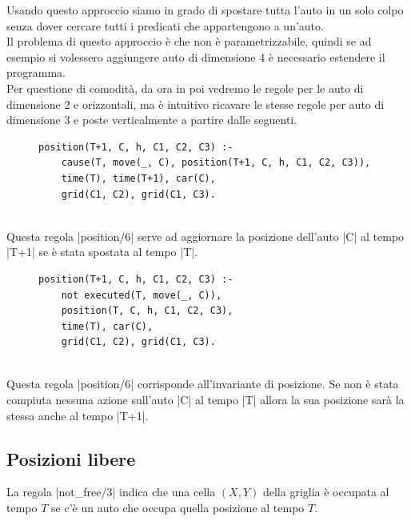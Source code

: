 \documentclass[10pt, a4paper, oneside]{article}
\begin{document}
\noindent
Usando questo approccio siamo in grado di spostare tutta l'auto in un solo colpo senza dover cercare tutti i predicati che appartengono a un'auto. \\

\noindent
Il problema di questo approccio è che non è parametrizzabile, quindi se ad esempio si volessero aggiungere auto di dimensione 4 è necessario estendere il programma. \\

\noindent
Per questione di comodità, da ora in poi vedremo le regole per le auto di dimensione 2 e orizzontali, ma è intuitivo ricavare le stesse regole per auto di dimensione 3 e poste verticalmente a partire dalle seguenti.

\begin{figure}[H]
\centering
\begin{verbatim}
position(T+1, C, h, C1, C2, C3) :-
    cause(T, move(_, C), position(T+1, C, h, C1, C2, C3)),
    time(T), time(T+1), car(C),
    grid(C1, C2), grid(C1, C3).
\end{verbatim}
\end{figure}


\noindent
\\ Questa regola |position/6| serve ad aggiornare la posizione dell'auto |C| al tempo
|T+1| se è stata spostata al tempo |T|.

\begin{figure}[H]
\centering
\begin{verbatim}
position(T+1, C, h, C1, C2, C3) :-
    not executed(T, move(_, C)),
    position(T, C, h, C1, C2, C3),
    time(T), car(C),
    grid(C1, C2), grid(C1, C3).
\end{verbatim}
\end{figure}


\noindent
\\Questa regola |position/6| corrisponde all'invariante di posizione. Se non è stata compiuta nessuna azione sull'auto |C| al tempo |T| allora la sua posizione sarà la stessa anche al tempo |T+1|.




\subsection{Posizioni libere}
La regola |not_free/3| indica che una cella $(X,Y)$ della griglia è occupata al tempo $T$ se c'è un auto che occupa quella posizione al tempo $T$.
\end{document}
